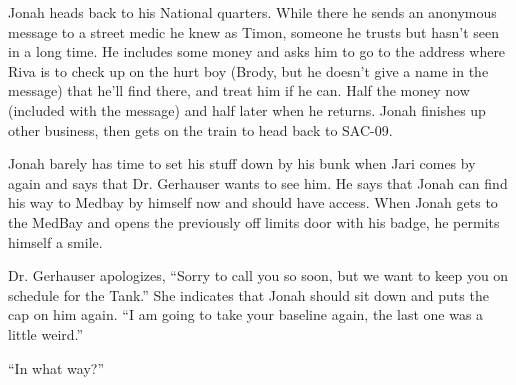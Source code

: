 Jonah heads back to his National quarters.  While there he sends an anonymous message to a street medic he knew as Timon, someone he trusts but hasn't seen in a long time.  He includes some money and asks him to go to the address where Riva is to check up on the hurt boy (Brody, but he doesn't give a name in the message) that he'll find there, and treat him if he can.  Half the money now (included with the message) and half later when he returns.  Jonah finishes up other business, then gets on the train to head back to SAC-09.




Jonah barely has time to set his stuff down by his bunk when Jari comes by again and says that Dr. Gerhauser wants to see him.  He says that Jonah can find his way to Medbay by himself now and should have access.  When Jonah gets to the MedBay and opens the previously off limits door with his badge, he permits himself a smile.



Dr. Gerhauser apologizes, ``Sorry to call you so soon, but we want to keep you on schedule for the Tank.''  She indicates that Jonah should sit down and puts the cap on him again.  ``I am going to take your baseline again, the last one was a little weird.''

``In what way?''

